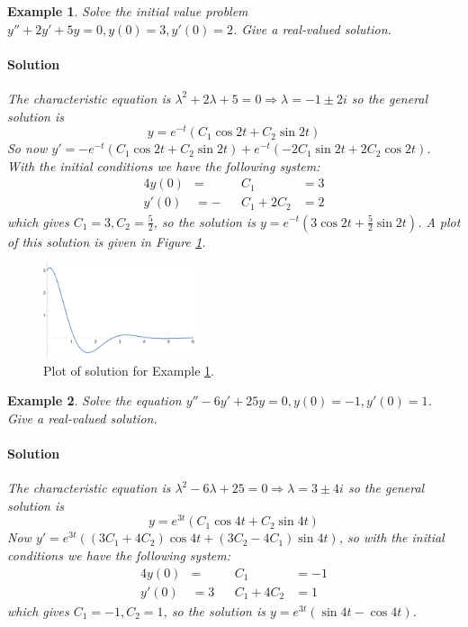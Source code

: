 \documentclass[letterpaper, 11pt, openany]{book}
\theoremstyle{mytheoremstyle}
\theoremstyle{myexamplestyle}
\newtheorem{example}{Example}[section]
\newenvironment{solution}{\paragraph{\sffamily \smaller \fontseries{b}\selectfont Solution}}{\hfill\faSquare}
\begin{document}
\begin{example}\label{e:de-2ocomp-negative}
    Solve the initial value problem \(y'' + 2y' + 5y = 0, y(0) = 3, y'(0) = 2\). Give a real-valued solution.
    \begin{solution}
        The characteristic equation is \(\lambda^{2} + 2\lambda + 5 =0 \Rightarrow \lambda = -1 \pm 2i\) so the general solution is
        \[y = e^{-t}\left(C_{1}\cos 2t + C_{2}\sin{2t}\right)\]
        So now 
        \(y' = -e^{-t}\left(C_{1}\cos 2t + C_{2}\sin{2t}\right) + e^{-t}\left(-2C_{1}\sin 2t + 2C_{2}\cos{2t}\right) \). With the initial conditions we have the following system:
        \begin{alignat*}{4}
            y(0)  &=  &&C_{1}    &= 3\\
            y'(0) &= -&&C_{1} + 2C_{2} &= 2
        \end{alignat*}
        which gives \(C_{1} = 3, C_{2} = \frac{5}{2}\), so the solution is \(y = e^{-t}\left(3\cos 2t + \frac{5}{2}\sin{2t}\right)\). A plot of this solution is given in Figure \ref{f:de-2ocomp-negative}.
    \end{solution}
\end{example}
\begin{figure}[htbp]
    \centering
        \includegraphics[width=0.4\textwidth]{Figures/de-2ocomp-negative.pdf}
    \caption{Plot of solution for Example \ref{e:de-2ocomp-negative}.}
    \label{f:de-2ocomp-negative}
\end{figure}
\begin{example}
    Solve the equation \(y'' - 6y' + 25y = 0, y(0) = -1, y'(0) = 1\). Give a real-valued solution.
    \begin{solution}
        The characteristic equation is \(\lambda ^{2} - 6\lambda + 25 = 0 \Rightarrow \lambda = 3 \pm 4i\) so the general solution is \[y = e^{3t} \left(C_{1}\cos 4t + C_{2} \sin 4t \right)\]
        Now \(y' = e^{3t} \left((3C_{1} + 4C_{2})\cos 4t + (3C_{2} - 4C_{1})\sin 4t\right)\), so with the initial conditions we have the following system:
        \begin{alignat*}{4}
            y(0)  &=  &&C_{1}    &= -1\\
            y'(0) &= 3&&C_{1} + 4C_{2} &= 1
        \end{alignat*}
        which gives \(C_{1}  = -1, C_{2} = 1\), so the solution is \(y = e^{3t} \left( \sin 4t - \cos 4t \right)\).
    \end{solution}
\end{example}
\end{document}
